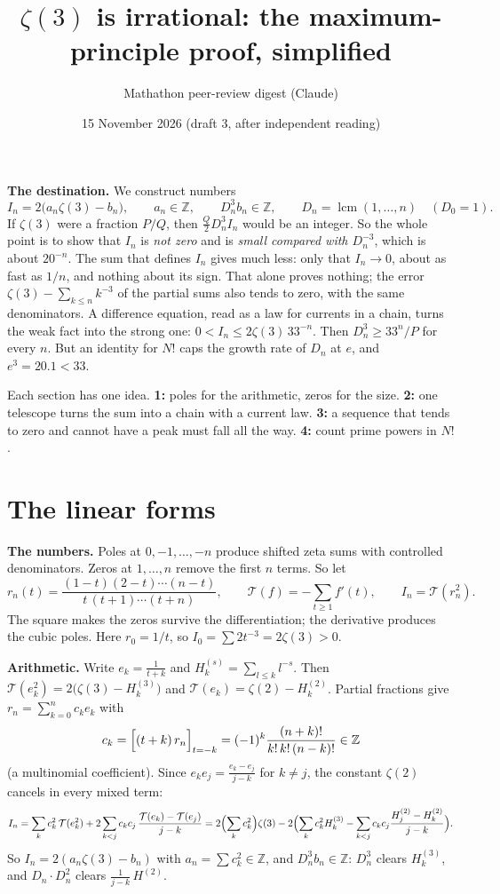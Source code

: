 \documentclass[11pt]{article}
\title{$\zeta(3)$ is irrational: the maximum-principle proof, simplified}
\author{Mathathon peer-review digest (Claude)}
\date{15 November 2026 \quad(draft 3, after independent reading)}
\newcommand{\Z}{\mathbb Z}
\newcommand{\T}{\mathcal T}
\DeclareMathOperator{\lcm}{lcm}
\newcommand{\q}[1]{\medskip\noindent\textbf{#1}}
\begin{document}
\maketitle

\noindent\textbf{The destination.} We construct numbers
\[
I_n=2\bigl(a_n\zeta(3)-b_n\bigr),\qquad a_n\in\Z,\qquad D_n^3b_n\in\Z,\qquad D_n=\lcm(1,\dots,n)\quad(D_0=1).
\]
If $\zeta(3)$ were a fraction $P/Q$, then $\frac Q2D_n^3I_n$ would be an integer. So the whole point
is to show that $I_n$ is \emph{not zero} and is \emph{small compared with $D_n^{-3}$}, which is about
$20^{-n}$. The sum that defines $I_n$ gives much less: only that $I_n\to0$, about as fast as $1/n$,
and nothing about its sign. That alone proves nothing; the error $\zeta(3)-\sum_{k\le n}k^{-3}$ of the
partial sums also tends to zero, with the same denominators. A difference equation, read as a law
for currents in a chain, turns the weak fact into the strong one: $0<I_n\le2\zeta(3)\,33^{-n}$. Then
$D_n^3\ge33^n/P$ for every $n$. But an identity for $N!$ caps the growth rate of $D_n$ at $e$, and
$e^3=20.1<33$.

\smallskip\noindent Each section has one idea. \textbf{1:} poles for the arithmetic, zeros for the
size. \textbf{2:} one telescope turns the sum into a chain with a current law. \textbf{3:} a
sequence that tends to zero and cannot have a peak must fall all the way. \textbf{4:} count prime
powers in $N!$.

\section{The linear forms}

\q{The numbers.} Poles at $0,-1,\dots,-n$ produce shifted zeta sums with controlled denominators.
Zeros at $1,\dots,n$ remove the first $n$ terms. So let
\[
r_n(t)=\frac{(1-t)(2-t)\cdots(n-t)}{t\,(t+1)\cdots(t+n)},\qquad \T(f)=-\sum_{t\ge1}f'(t),\qquad
I_n=\T(r_n^2).
\]
The square makes the zeros survive the differentiation; the derivative produces the cubic poles.
Here $r_0=1/t$, so $I_0=\sum2t^{-3}=2\zeta(3)>0$.

\q{Arithmetic.} Write $e_k=\frac1{t+k}$ and $H^{(s)}_k=\sum_{l\le k}l^{-s}$. Then
$\T(e_k^2)=2\bigl(\zeta(3)-H^{(3)}_k\bigr)$ and $\T(e_k)=\zeta(2)-H^{(2)}_k$. Partial fractions give
$r_n=\sum_{k=0}^nc_ke_k$ with
\[
c_k=\Bigl[(t+k)\,r_n\Bigr]_{t=-k}=(-1)^k\frac{(n+k)!}{k!\,k!\,(n-k)!}\in\Z
\]
(a multinomial coefficient). Since $e_ke_j=\frac{e_k-e_j}{j-k}$ for $k\ne j$, the constant $\zeta(2)$
cancels in every mixed term:
\[
I_n=\sum_kc_k^2\,\T(e_k^2)+2\sum_{k<j}c_kc_j\,\frac{\T(e_k)-\T(e_j)}{j-k}
=2\Bigl(\sum_kc_k^2\Bigr)\zeta(3)-2\Bigl(\sum_kc_k^2H^{(3)}_k-\sum_{k<j}c_kc_j\frac{H^{(2)}_j-H^{(2)}_k}{j-k}\Bigr).
\]
So $I_n=2(a_n\zeta(3)-b_n)$ with $a_n=\sum c_k^2\in\Z$, and $D_n^3b_n\in\Z$: $D_n^3$ clears
$H^{(3)}_k$, and $D_n\cdot D_n^2$ clears $\frac1{j-k}\,H^{(2)}$.
\end{document}
